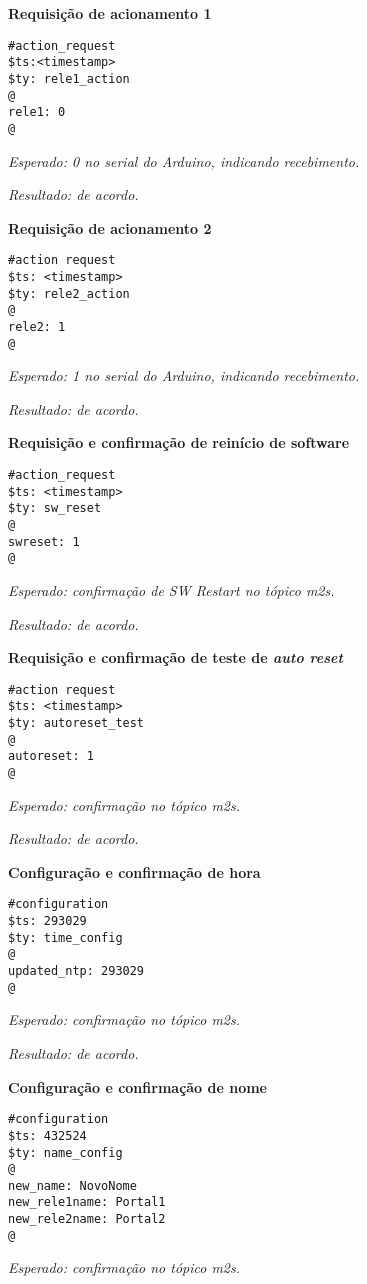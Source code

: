 \textbf{Requisição de acionamento 1}
\begin{lstlisting}
#action_request
$ts:<timestamp>
$ty: rele1_action
@
rele1: 0
@
\end{lstlisting}

\emph{Esperado: 0 no serial do Arduino, indicando recebimento.}

\emph{Resultado: de acordo.}

\textbf{Requisição de acionamento 2}
\begin{lstlisting}
#action request
$ts: <timestamp>
$ty: rele2_action
@
rele2: 1
@
\end{lstlisting}

\emph{Esperado: 1 no serial do Arduino, indicando recebimento.}

\emph{Resultado: de acordo.}

\textbf{Requisição e confirmação de reinício de software}
\begin{lstlisting}
#action_request
$ts: <timestamp>
$ty: sw_reset
@
swreset: 1
@
\end{lstlisting}

\emph{Esperado: confirmação de SW Restart no tópico \wmqtt{} m2s.}

\emph{Resultado: de acordo.}

\textbf{Requisição e confirmação de teste de \emph{auto reset}}
\begin{lstlisting}
#action request
$ts: <timestamp>
$ty: autoreset_test
@
autoreset: 1
@
\end{lstlisting}

\emph{Esperado: confirmação no tópico \wmqtt{} m2s.}

\emph{Resultado: de acordo.}

\textbf{Configuração e confirmação de hora}
\begin{lstlisting}
#configuration
$ts: 293029
$ty: time_config
@
updated_ntp: 293029
@
\end{lstlisting}

\emph{Esperado: confirmação no tópico \wmqtt{} m2s.}

\emph{Resultado: de acordo.}

\textbf{Configuração e confirmação de nome}
\begin{lstlisting}
#configuration
$ts: 432524
$ty: name_config
@
new_name: NovoNome
new_rele1name: Portal1
new_rele2name: Portal2
@
\end{lstlisting}

\emph{Esperado: confirmação no tópico \wmqtt{} m2s.}

